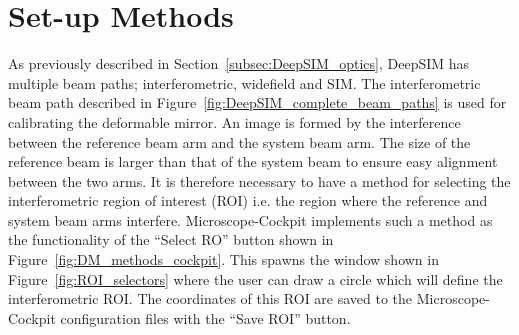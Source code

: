 \section{Set-up Methods}
\label{sec:set_up_methods}

As previously described in Section~\ref{subsec:DeepSIM_optics}, DeepSIM has multiple beam paths; interferometric, widefield and SIM. The interferometric beam path described in Figure~\ref{fig:DeepSIM_complete_beam_paths} is used for calibrating the deformable mirror. An image is formed by the interference between the reference beam arm and the system beam arm. The size of the reference beam is larger than that of the system beam to ensure easy alignment between the two arms. It is therefore necessary to have a method for selecting the interferometric region of interest (ROI) i.e. the region where the reference and system beam arms interfere. Microscope-Cockpit implements such a method as the functionality of the ``Select RO'' button shown in Figure~\ref{fig:DM_methods_cockpit}. This spawns the window shown in Figure~\ref{fig:ROI_selectors} where the user can draw a circle which will define the interferometric ROI. The coordinates of this ROI are saved to the Microscope-Cockpit configuration files with the ``Save ROI'' button.

